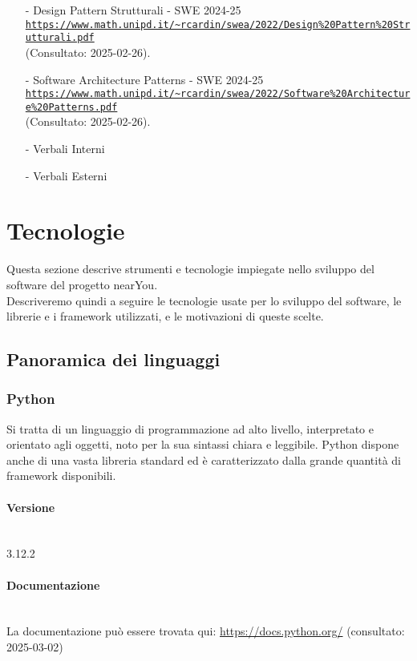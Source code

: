 \documentclass[10pt]{article}
\newcommand{\myparagraph}[1]{\paragraph{#1}\mbox{}\\\vspace{0.4em}}
\begin{document}
\begin{justify}
\begin{itemize}
    \item[-] Design Pattern Strutturali - SWE 2024-25\\
    \textcolor{blue}{\texttt{\url{https://www.math.unipd.it/~rcardin/swea/2022/Design%20Pattern%20Strutturali.pdf}}}\\ (Consultato: 2025-02-26).

    \item[-] Software Architecture Patterns - SWE 2024-25\\
    \textcolor{blue}{\texttt{\url{https://www.math.unipd.it/~rcardin/swea/2022/Software%20Architecture%20Patterns.pdf}}}\\ (Consultato: 2025-02-26).

    \item[-] Verbali Interni
    \item[-] Verbali Esterni
\end{itemize}

\section{Tecnologie}
Questa sezione descrive strumenti e tecnologie impiegate nello sviluppo del software del progetto nearYou.\\
Descriveremo quindi a seguire le tecnologie usate per lo sviluppo del software, le librerie e i framework utilizzati, e le motivazioni di queste scelte.\\

    \subsection{Panoramica dei linguaggi}
        \subsubsection{Python}
            Si tratta di un linguaggio di programmazione ad alto livello, interpretato e orientato agli oggetti, noto per la sua sintassi chiara e leggibile. Python dispone
            anche di una vasta libreria standard ed è caratterizzato dalla grande quantità di framework disponibili.\\
            \myparagraph{Versione}
                3.12.2
            \myparagraph{Documentazione}
                     La documentazione può essere trovata qui: \url{https://docs.python.org/} (consultato: 2025-03-02)

\end{justify}
\end{document}
